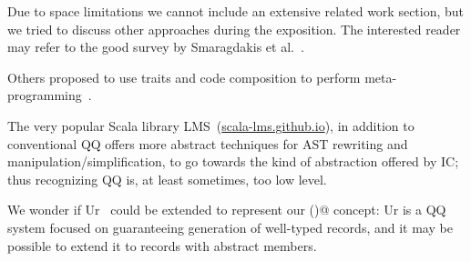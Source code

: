 Due to space limitations we cannot include an extensive related work section,
but we tried to discuss other approaches during the exposition.
The interested reader may refer to the good survey by Smaragdakis et al.~\cite{smaragdakis2015structured}.

Others proposed to use traits and code composition to perform meta-programming~\cite{reppy2007metaprogramming}.

The very popular Scala library LMS~(\url{scala-lms.github.io}), in addition to conventional QQ offers
more abstract techniques for AST rewriting and manipulation/simplification,
to go towards the kind of abstraction offered by IC;
thus recognizing QQ is, at least sometimes, too low level.

We wonder if Ur~\cite{chlipala2010ur} could be extended to represent our \Q@inductive()@ concept:
Ur is a QQ system focused on guaranteeing generation of well-typed records,
and it may be possible to extend it to records with abstract members.
